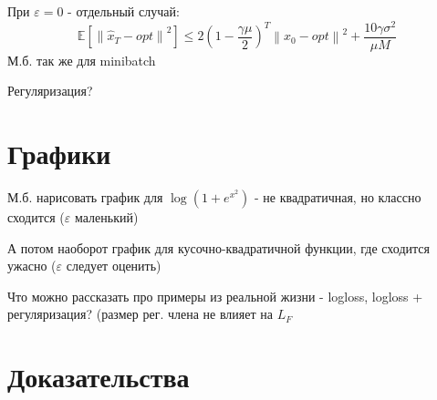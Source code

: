 \documentclass{article}
\theoremstyle{plain}
\newcommand{\norm}[1]{\left\|#1\right\|}
\newcommand{\E}{\mathbb{E}}
\begin{document}
При $\varepsilon = 0$ - отдельный случай:
\begin{equation}\label{eq:lemma_quadratic}
\E[\norm{\hat{x}_T - opt}^2]
\leq
2 (1 - \frac{\gamma \mu}{2})^T \norm{x_0 - opt}^2 + \frac{10 \gamma \sigma^2}{\mu M}
\end{equation}
М.б. так же для minibatch

Регуляризация?

\section{Графики}
М.б. нарисовать график для $\log(1 + e^{x^2})$ - не квадратичная, но классно сходится ($\varepsilon$ маленький)


А потом наоборот график для кусочно-квадратичной функции, где сходится ужасно ($\varepsilon$ следует оценить)

Что можно рассказать про примеры из реальной жизни - logloss, logloss + регуляризация? (размер рег. члена не влияет на $L_{F}$


\section{Доказательства}
\end{document}
